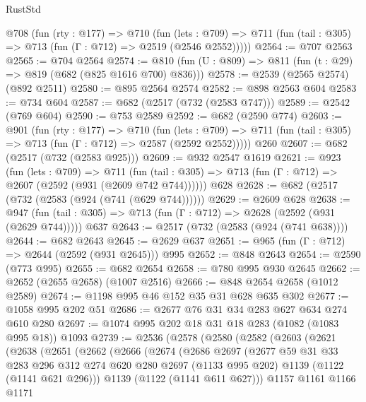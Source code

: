 \begin{lexlean}{RustStd}
\begin{coremodule}
  @708
    (fun (rty : @177) =>
    @710
      (fun (lets : @709) =>
      @711 (fun (tail : @305) => @713 (fun (Γ : @712) => @2519 (@2546 @2552)))))
@2564 := @707 @2563
@2565 := @704 @2564
@2574 := @810 (fun (U : @809) => @811 (fun (t : @29) => @819 (@682 (@825 @1616 @700) @836)))
@2578 := @2539 (@2565 @2574) (@892 @2511)
@2580 := @895 @2564 @2574
@2582 := @898 @2563 @604
@2583 := @734 @604
@2587 := @682 (@2517 (@732 (@2583 @747)))
@2589 := @2542 (@769 @604)
@2590 := @753 @2589
@2592 := @682 (@2590 @774)
@2603 := @901
    (fun (rty : @177) =>
    @710
      (fun (lets : @709) =>
      @711 (fun (tail : @305) => @713 (fun (Γ : @712) => @2587 (@2592 @2552)))))
    @260
@2607 := @682 (@2517 (@732 (@2583 @925)))
@2609 := @932 @2547 @1619
@2621 := @923
    (fun (lets : @709) =>
    @711 (fun (tail : @305) => @713 (fun (Γ : @712) => @2607 (@2592 (@931 (@2609 @742 @744))))))
    @628
@2628 := @682 (@2517 (@732 (@2583 (@924 (@741 (@629 @744))))))
@2629 := @2609 @628
@2638 := @947 (fun (tail : @305) => @713 (fun (Γ : @712) => @2628 (@2592 (@931 (@2629 @744))))) @637
@2643 := @2517 (@732 (@2583 (@924 (@741 @638))))
@2644 := @682 @2643
@2645 := @2629 @637
@2651 := @965 (fun (Γ : @712) => @2644 (@2592 (@931 @2645))) @995
@2652 := @848 @2643
@2654 := @2590 (@773 @995)
@2655 := @682 @2654
@2658 := @780 @995 @930 @2645
@2662 := @2652 (@2655 @2658) (@1007 @2516)
@2666 := @848 @2654 @2658 (@1012 @2589)
@2674 := @1198 @995 @46 @152 @35 @31 @628 @635 @302
@2677 := @1058 @995 @202 @51
@2686 := @2677 @76 @31 @34 @283 @627 @634 @274 @610 @280
@2697 := @1074 @995 @202 @18 @31 @18 @283 (@1082 (@1083 @995 @18)) @1093
@2739 := @2536
    (@2578
      (@2580
        (@2582
          (@2603
            (@2621
              (@2638
                (@2651
                  (@2662
                    (@2666
                      (@2674
                        (@2686
                          @2697
                          (@2677
                            @59
                            @31
                            @33
                            @283
                            @296
                            @312
                            @274
                            @620
                            @280
                            @2697
                            (@1133 @995 @202)
                            @1139
                            (@1122 (@1141 @621 @296)))
                          @1139
                          (@1122 (@1141 @611 @627)))
                        @1157
                        @1161
                        @1166
                        @1171

\end{coremodule}
\end{lexlean}
